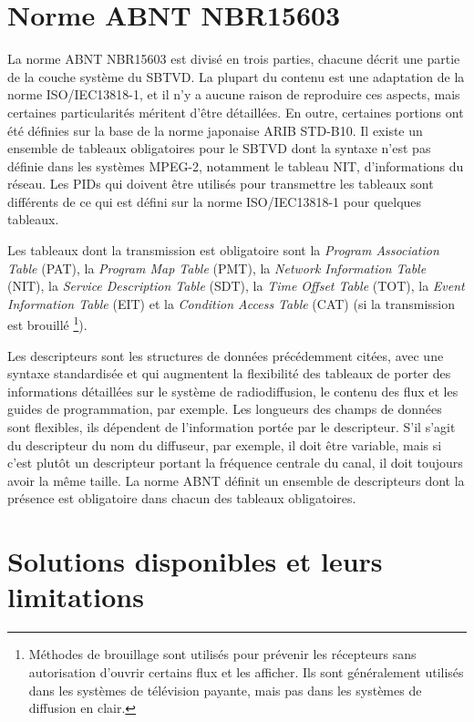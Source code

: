 \documentclass[12pt,a4paper]{article}
\begin{document}
\section{Norme ABNT NBR15603}
\label{nbr15603}

La norme ABNT NBR15603 est divisé en trois parties, chacune décrit une partie de la couche système du SBTVD. La plupart du contenu est une adaptation de la norme ISO/IEC13818-1, et il n'y a aucune raison de reproduire ces aspects, mais certaines particularités méritent d'être détaillées. En outre, certaines portions ont été définies sur la base de la norme japonaise ARIB STD-B10. Il existe un ensemble de tableaux obligatoires pour le SBTVD dont la syntaxe n'est pas définie dans les systèmes MPEG-2, notamment le tableau NIT, d'informations du réseau. Les PIDs qui doivent être utilisés pour transmettre les tableaux sont différents de ce qui est défini sur la norme ISO/IEC13818-1 pour quelques tableaux.

Les tableaux dont la transmission est obligatoire sont la \textit{Program Association Table} (PAT), la \textit{Program Map Table} (PMT), la \textit{Network Information Table} (NIT), la \textit{Service Description Table} (SDT), la \textit{Time Offset Table} (TOT), la \textit{Event Information Table} (EIT) et la \textit{Condition Access Table}  (CAT) (si la transmission est brouillé \footnote{Méthodes de brouillage sont utilisés pour prévenir les récepteurs sans autorisation d'ouvrir certains flux et les afficher. Ils sont généralement utilisés dans les systèmes de télévision payante, mais pas dans les systèmes de diffusion en clair.}).

Les descripteurs sont les structures de données précédemment citées, avec une syntaxe standardisée et qui augmentent la flexibilité des tableaux de porter des informations détaillées sur le système de radiodiffusion, le contenu des flux et les guides de programmation, par exemple. Les longueurs des champs de données sont flexibles, ils dépendent de l'information portée par le descripteur. S'il s'agit du descripteur du nom du diffuseur, par exemple, il doit être variable, mais si c'est plutôt un descripteur portant la fréquence centrale du canal, il doit toujours avoir la même taille. La norme ABNT définit un ensemble de descripteurs dont la présence est obligatoire dans chacun des tableaux obligatoires.

\section{Solutions disponibles et leurs limitations}
\end{document}
